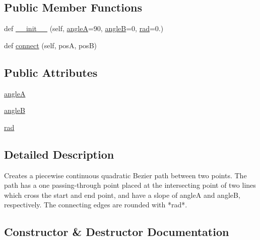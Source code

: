 \subsection*{Public Member Functions}
\begin{DoxyCompactItemize}
\item 
def \hyperlink{classmatplotlib_1_1patches_1_1ConnectionStyle_1_1Angle_aef7d136f4d11feeb702eeafc7cab1401}{\+\_\+\+\_\+init\+\_\+\+\_\+} (self, \hyperlink{classmatplotlib_1_1patches_1_1ConnectionStyle_1_1Angle_a6365c9f82ee6ddeb49179a7ab99ae704}{angleA}=90, \hyperlink{classmatplotlib_1_1patches_1_1ConnectionStyle_1_1Angle_ae9d7e356c7b8a65e8200443961b3649c}{angleB}=0, \hyperlink{classmatplotlib_1_1patches_1_1ConnectionStyle_1_1Angle_ad4ba323db4653f271681448fd69aaeee}{rad}=0.)
\item 
def \hyperlink{classmatplotlib_1_1patches_1_1ConnectionStyle_1_1Angle_a225e836d2ad76e9a2e68cb1950a484e6}{connect} (self, posA, posB)
\end{DoxyCompactItemize}
\subsection*{Public Attributes}
\begin{DoxyCompactItemize}
\item 
\hyperlink{classmatplotlib_1_1patches_1_1ConnectionStyle_1_1Angle_a6365c9f82ee6ddeb49179a7ab99ae704}{angleA}
\item 
\hyperlink{classmatplotlib_1_1patches_1_1ConnectionStyle_1_1Angle_ae9d7e356c7b8a65e8200443961b3649c}{angleB}
\item 
\hyperlink{classmatplotlib_1_1patches_1_1ConnectionStyle_1_1Angle_ad4ba323db4653f271681448fd69aaeee}{rad}
\end{DoxyCompactItemize}


\subsection{Detailed Description}
\begin{DoxyVerb}Creates a piecewise continuous quadratic Bezier path between
two points. The path has a one passing-through point placed at
the intersecting point of two lines which cross the start
and end point, and have a slope of angleA and angleB, respectively.
The connecting edges are rounded with *rad*.
\end{DoxyVerb}
 

\subsection{Constructor \& Destructor Documentation}
\mbox{\label{classmatplotlib_1_1patches_1_1ConnectionStyle_1_1Angle_aef7d136f4d11feeb702eeafc7cab1401}} 
